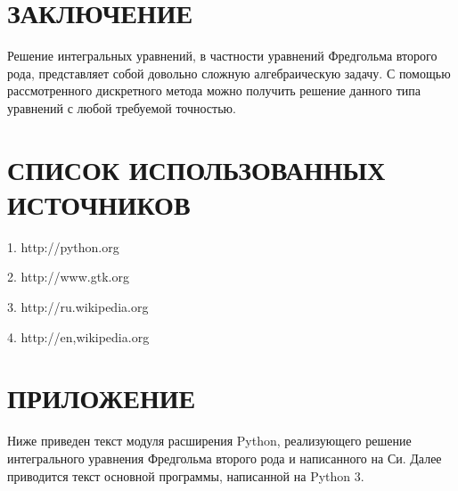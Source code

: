 \section*{ЗАКЛЮЧЕНИЕ}
Решение интегральных уравнений, в частности уравнений Фредгольма второго рода, представляет собой довольно сложную алгебраическую задачу. С помощью рассмотренного дискретного метода можно получить решение данного типа уравнений с любой требуемой точностью.
\section*{СПИСОК ИСПОЛЬЗОВАННЫХ ИСТОЧНИКОВ}
1. http://python.org

2. http://www.gtk.org

3. http://ru.wikipedia.org

4. http://en,wikipedia.org
\section*{ПРИЛОЖЕНИЕ}
Ниже приведен текст модуля расширения Python, реализующего решение интегрального уравнения Фредгольма второго рода и написанного на Си.
Далее приводится текст основной программы, написанной на Python 3.

